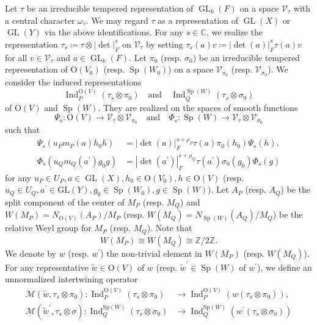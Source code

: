 \documentclass[article]{article}
\numberwithin{equation}{section}
\theoremstyle{definition}
\DeclareMathOperator{\Ind}{Ind}
\DeclareMathOperator{\GL}{GL}
\DeclareMathOperator{\SP}{Sp}
\begin{document}
Let $\tau$ be an irreducible tempered representation of $\GL_{k}(F)$ on a space $\mathscr{V}_{\tau}$ with a central character $\omega_{\tau}$. We may regard $\tau$ as a representation of $\GL(X)$ or $\GL(Y)$ via the above identifications. For any $s \in \mathbb{C}$, we realize the representation $\tau_{s} \coloneqq \tau \otimes|\det|_{F}^{s}$ on $\mathscr{V}_{\tau}$ by setting $\tau_{s}(a) v \coloneqq |\det(a)|_{F}^{s} \tau(a) v$ for all $v \in \mathscr{V}_{\tau}$ and $a \in \GL_{k}(F)$. Let $\pi_0$ (resp. $\sigma_0$) be an irreducible tempered representation of $\mathrm{O}(V_0)$ (resp. $\SP(W_0)$) on a space $\mathscr{V}_{\pi_0}$ (resp. $\mathscr{V}_{\sigma_0}$). We consider the induced representations 
$$\Ind_{P}^{\mathrm O\left(V\right)}\left(\tau_{s} \otimes \pi_0 \right) \quad \mbox{and} \quad \Ind_{Q}^{\SP\left(W\right)}\left(\tau_{s} \otimes \sigma_0 \right)$$
of $\mathrm O(V)$ and $\SP(W)$. They are realized on the spaces of smooth functions 
$$\Psi_{s} : \mathrm O(V) \rightarrow \mathscr{V}_{\tau} \otimes \mathscr{V}_{\pi_0}\quad  \mbox{and} \quad \Phi_{s}: \operatorname{Sp}\left(W\right) \rightarrow \mathscr{V}_{\tau} \otimes \mathscr{V}_{\sigma_0}$$
such that
\begin{align*} \Psi_{s}\left(u_{P} m_{P}(a) h_0 h\right) &=|\det(a)|_{F}^{s+\rho_{P}} \tau(a) \pi_0(h_0) \Psi_{s}\left(h\right), \\ 
\Phi_{s}\left(u_{Q} m_{Q}\left(a^{\prime}\right) g_0 g\right) &=\left|\operatorname{det}\left(a^{\prime}\right)\right|_{F}^{s+\rho_{Q}} \tau\left(a^{\prime}\right) \sigma_0(g_0) \Phi_{s}\left(g\right)
\end{align*}
for any $u_{P} \in U_{P}, a\in \GL(X), h_0\in \mathrm{O}(V_0), h \in \mathrm{O}(V)$ (resp. $u_{Q} \in U_{Q}, a^{\prime} \in \mathrm{GL}(Y), g_0 \in \SP(W_0),g \in \SP(W)$). Let $A_{P}$ (resp. $A_{Q}$) be the split component of the center of $M_{P}$ (resp. $M_{Q}$) and $W\left(M_{P}\right)=N_{\mathrm O(V)}(A_P)/M_P$
(resp. $W(M_{Q})=N_{\SP(W)}(A_Q)/M_Q$) be the relative Weyl group for $M_{P}$ (resp. $M_{Q}$). Note that 
$$W(M_{P}) \cong W(M_{Q}) \cong \mathbb{Z} / 2 \mathbb{Z}.$$ 
We denote by $w$ (resp. $ w^{\prime}$) the non-trivial element in $W(M_{P})$ (resp. $W(M_{Q}) $). For any representative $\widetilde{w} \in \mathrm{O}(V)$ of $w$ (resp. $\widetilde{w}^{\prime}\in \SP(W)$ of $w^{\prime}$), we define an unnormalized intertwining operator 
\begin{align*}
\mathcal{M}\left(\widetilde{w}, \tau_{s} \otimes \pi_0\right) : \Ind_{P}^{\mathrm{O}(V)}\left(\tau_{s} \otimes \pi_0 \right) &\longrightarrow \operatorname{Ind}_{P}^{\mathrm{O}(V)}\left(w\left(\tau_{s} \otimes \pi_0 \right)\right),\\
\mathcal{M}\left(\widetilde{w}^{\prime}, \tau_{s} \otimes \sigma \right) : \operatorname{Ind}_{Q}^{\mathrm{Sp}(W)}\left(\tau_{s} \otimes \sigma_0 \right) &\longrightarrow \operatorname{Ind}_{Q}^{\mathrm{Sp}(W)}\left(w^{\prime}\left(\tau_{s} \otimes \sigma_0 \right)\right)
\end{align*}
\end{document}
